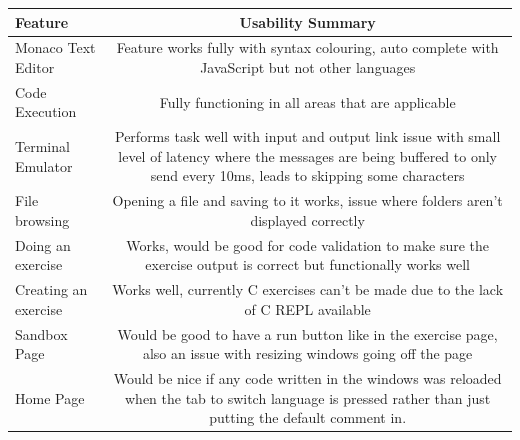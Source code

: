 \begin{table}[h]
    \centering
    \begin{tabulary}{\textwidth}{l|C}
        \textbf{Feature} & \textbf{Usability Summary}\\
        \hline
        Monaco Text Editor & Feature works fully with syntax colouring, auto complete with JavaScript but not other languages\\
        \hline
        Code Execution & Fully functioning in all areas that are applicable\\
        \hline
        Terminal Emulator & Performs task well with input and output link issue with small level of latency where the messages are being buffered to only send every 10ms, leads to skipping some characters\\
        \hline
        File browsing & Opening a file and saving to it works, issue where folders aren't displayed correctly\\
        \hline
        Doing an exercise & Works, would be good for code validation to make sure the exercise output is correct but functionally works well\\
        \hline
        Creating an exercise & Works well, currently C exercises can't be made due to the lack of C REPL available\\
        \hline
        Sandbox Page & Would be good to have a run button like in the exercise page, also an issue with resizing windows going off the page\\
        \hline
        Home Page & Would be nice if any code written in the windows was reloaded when the tab to switch language is pressed rather than just putting the default comment in.\\
    \end{tabulary}
\end{table}











